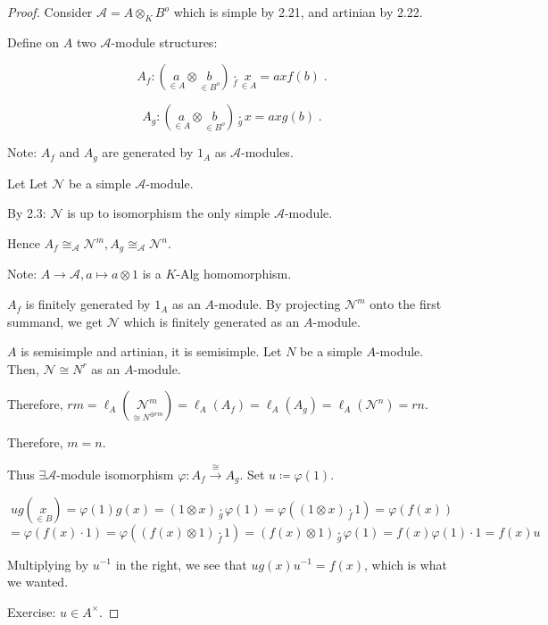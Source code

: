 \documentclass{article}
\theoremstyle{definition}
\theoremstyle{plain}
\theoremstyle{remark}
\begin{document}
    \begin{proof}
        Consider \(\mathscr{A} = A \otimes_K B^o\) which is simple by 2.21, and artinian by 2.22.

        Define on \(A\) two \(\mathscr{A}\)-module structures:

        \[
            A_f : (\underset{\in A}{a} \otimes \underset{\in B^o}{b}) \underset{f}{\cdot} \underset{\in A}{x} = ax f(b)\;. 
        \]

        \[
            A_g : (\underset{\in A}{a} \otimes \underset{\in B^o}{b}) \underset{g}{\cdot} x = a x g(b)\;.
        \]

        Note: \(A_f\) and \(A_g\) are generated by \(1_A\) as \(\mathscr{A}\)-modules.

        Let Let \(\mathscr{N}\) be a simple \(\mathscr{A}\)-module.

        By 2.3: \(\mathscr{N}\) is up to isomorphism the only simple \(\mathscr{A}\)-module.

        Hence \(A_f \cong_{\mathscr{A}} \mathscr{N}^m , A_g \cong_{\mathscr{A}} \mathscr{N}^n\).

        Note: \(A \to \mathscr{A} , a \mapsto a \otimes 1\) is a \(K\)-Alg homomorphism.

        \(A_f\) is finitely generated by \(1_A\) as an \(A\)-module. By projecting \(\mathscr{N}^m\) onto the first summand, we get \(\mathscr{N}\) which is finitely generated as an \(A\)-module.

        \(A\) is semisimple and artinian, it is semisimple. Let \(N\) be a simple \(A\)-module. Then, \(\mathscr{N} \cong N^r\) as an \(A\)-module.

        Therefore, \(rm = \ell_A(\underset{\cong N^{\oplus rm}}{\mathscr{N}^m}) = \ell_A(A_f) = \ell_A(A_g) = \ell_A(\mathscr{N}^n) = rn\).
        
        Therefore, \(m = n\).

        Thus \(\exists \mathscr{A}\)-module isomorphism \(\varphi : A_f \xrightarrow{\cong} A_g\). Set \(u \coloneqq \varphi(1)\).

        \[
            ug(\underset{\in B}{x}) = \varphi (1) g(x) = (1 \otimes x) \underset{g}{\cdot} \varphi(1) = \varphi((1 \otimes x) \underset{f}{\cdot} 1) = \varphi (f(x))
        \]
        \[    
            = \varphi(f(x) \cdot 1) = \varphi((f(x) \otimes 1) \underset{f}{\cdot} 1) = (f(x) \otimes 1) \underset{g}{\cdot} \varphi (1) = f(x) \varphi (1) \cdot 1 = f(x) u 
        \]

        Multiplying by \(u ^{-1} \) in the right, we see that \(u g(x) u ^{-1} = f(x)\), which is what we wanted.

        Exercise: \(u \in A^\times\).

    \end{proof}
\end{document}
